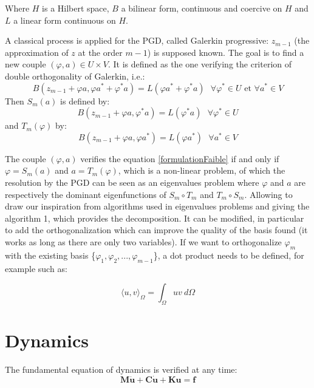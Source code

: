 \documentclass[12pt,a4paper]{article}
\begin{document}
Where $H$ is a Hilbert space, $B$ a bilinear form, continuous and coercive on $H$ and $L$ a linear form continuous on $H$.

A classical process is applied for the PGD, called Galerkin progressive: $z_{m-1}$ (the approximation of $z$ at the order $m-1$) is supposed known. The goal is to find a new couple $(\varphi, a) \in  U \times V$. It is defined as the one verifying the criterion of double orthogonality of Galerkin, i.e.:
\begin{equation}
\label{formulationFaible}
B(z_{m-1} + \varphi a , \varphi a^* + \varphi^*  a) = L (\varphi a^* + \varphi^* a) ~~~
\forall \varphi^*  \in U \text{ et } \forall a^* \in V 
\end{equation}
Then $S_m (a)$ is defined by:
\begin{equation}
B(z_{m-1} + \varphi a , \varphi^*  a) = L (\varphi^* a) ~~~
\forall \varphi^*  \in U
\end{equation}
and $T_m (\varphi)$ by:
\begin{equation}
B(z_{m-1} + \varphi a , \varphi a^*) = L (\varphi a^* ) ~~~
\forall a^* \in V 
\end{equation}

The couple  $(\varphi, a)$ verifies the equation \ref{formulationFaible} if and only if $\varphi = S_m (a)$ and $a = T_m (\varphi)$, which is a non-linear problem, of which the resolution by the PGD can be seen as an eigenvalues problem where $\varphi$ and $a$ are respectively the dominant eigenfunctions of $S_m \circ T_m$ and $T_m \circ S_m$. Allowing to draw our inspiration from algorithms used in eigenvalues problems and giving the algorithm 1, which provides the decomposition.  It can be modified, in particular to add the orthogonalization which can improve the quality of the basis found (it works as long as there are only two variables). If we want to orthogonalize $\varphi_m$ with the existing basis \{$\varphi_1 , \varphi_2 , ... , \varphi_{m-1}$\}, a dot product needs to be defined, for example such as:

\begin{equation}
\langle u,v \rangle_\Omega = \int_\Omega \! uv ~ d\Omega
\end{equation}


\section{Dynamics}
\noindent
The fundamental equation of dynamics is verified at any time:
\[
\mathbf{M}\mathbf{\ddot{u}} + \mathbf{C}\mathbf{\dot{u}} + \mathbf{K}\mathbf{u} =
\mathbf{f}
\]
\end{document}
